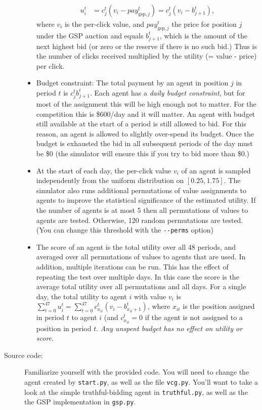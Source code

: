 \documentclass[11pt]{article}
\begin{document}
\begin{description}
\begin{itemize}
\begin{align}
u_i^t &=  c^t_j(v_i - \mathit{pay}_{\mathrm{gsp},j}^t) = c^t_j(v_i - b^t_{j+1}),
\end{align}
%
where $v_i$ is the per-click value,
and $\mathit{pay}^t_{\mathrm{gsp},j}$ the
price for position $j$ under the GSP auction and equals
$b^t_{j+1}$, which
is the amount of the next highest 
bid (or zero
or the reserve if there
is no such bid.) 
Thus is the number of clicks received multiplied by the
utility (= value - price) per click.
%
%				
\item Budget constraint: The total payment by an agent in position $j$
  in period $t$ is $c_j^t b^t_{j+1}$. Each agent has a {\em daily
    budget constraint}, but for most of the assignment this will be
  high enough not to matter. For the competition this is \$600/day and
  it will matter.
 An agent  with budget still available at the start
of a period is still allowed to bid. For this reason, an
agent  is allowed to slightly over-spend its budget.
Once the budget is exhausted the 
bid in all 
subsequent periods  of the day 
must be \$0 (the
  simulator will ensure this if you try to bid more than \$0.)
%				
\item At the start of each day, the per-click value $v_i$ of an agent
  is sampled independently from the uniform distribution on
  $[0.25,1.75]$.  The simulator also runs additional permutations of
  value assignments to agents to improve the statistical
  significance of the estimated utility.
If the number of agents is at most 5 then 
all permutations 
 of values to agents 
are tested. Otherwise,
  120 random permutations are tested. (You can change this threshold
  with the \verb+--perms+ option)
%
\item The score of an agent is the total utility over all 48 periods,
  and averaged over all permutations of values to agents that are
  used.  In addition, multiple iterations can be run. This has the
  effect of repeating the test over multiple days.  In this case the
  score is the average total utility over all permutations and all
  days.  For a single day, the total utility to agent $i$ with value
  $v_i$ is $\sum_{t=0}^{47} u_i^t = \sum_{t=0}^{47} c_{x_{it}}^t(v_i -
  b_{x_{it}+1}^t)$, where $x_{it}$ is the position assigned in period $t$ to agent $i$ (and
  $c_{x_{it}}^t=0$ if the agent is not assigned to a position in period $t$.
{\em Any unspent  budget has no effect on utility or score}.
			\end{itemize}
%
		\item[Source code:] Familiarize yourself with the provided code. You will need to change the agent created by \verb+start.py+, as well as the file \verb+vcg.py+. You'll want to take a look at the simple truthful-bidding agent in \verb+truthful.py+, as well as the the GSP implementation in \verb+gsp.py+.


\end{description}
\end{document}
